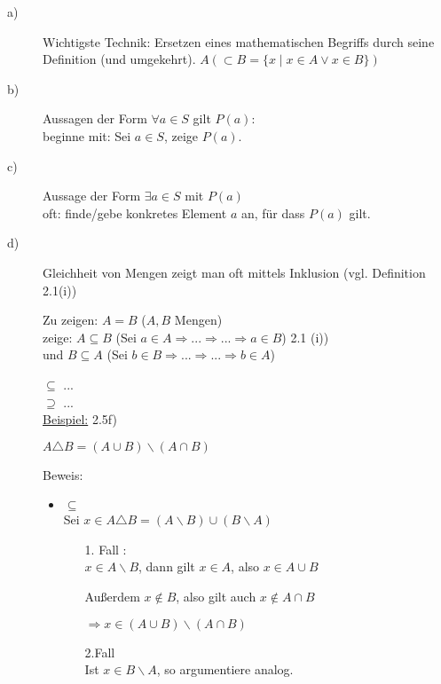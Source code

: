 \documentclass[a4paper, 12pt, twoside] {article}
\begin{document}
\begin{description}
\item[a)]
Wichtigste Technik: Ersetzen eines mathematischen Begriffs durch seine Definition (und umgekehrt).
$A( \subset B = \{x \mid x \in A \lor x \in B\})$

\item[b)]
Aussagen der Form $\forall a \in S$ gilt $P(a)$: \\
beginne mit: Sei $a \in S$, zeige $P(a)$.

\item[c)]
Aussage der Form $\exists a \in S$ mit $P(a)$ \\
oft: finde/gebe konkretes Element $a$ an, für dass $P(a)$ gilt.

\item[d)]
Gleichheit von Mengen zeigt man oft mittels Inklusion (vgl. Definition 2.1(i))

Zu zeigen: $A = B$ ($A, B$ Mengen) \\
zeige: $A \subseteq B$ (Sei $a \in A \Rightarrow ... \Rightarrow ... \Rightarrow a \in B$) 2.1 (i)) \\
und $B \subseteq A$ (Sei $b \in B \Rightarrow ... \Rightarrow ... \Rightarrow b \in A$)

\textit{$\subseteq$} ...\\
\textit{$\supseteq$} ... \\

\underline{Beispiel:} 2.5f)

$A \triangle B = (A \cup B) \backslash (A \cap B)$

Beweis:

\begin{itemize}
\item{$\subseteq$} \\
Sei $x \in A \triangle B = (A \backslash B) \cup (B \backslash A)$

\begin{itemize}
\item[1. Fall]: \hfill \\
$x \in A \backslash B$, dann gilt $x \in A$, also $x \in A \cup B$

Außerdem $x \notin B$, also gilt auch $x \notin A \cap B$

$\Rightarrow x \in (A \cup B) \backslash (A \cap B)$

\item[2.Fall] \hfill \\
Ist $ x \in B \backslash A$, so argumentiere analog.
\end{itemize}


\end{itemize}
\end{description}
\end{document}
